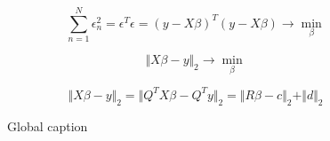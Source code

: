 
\begin{equation}
  \label{eq:minimization}
  \sum\limits^{N}_{n=1} \epsilon^2_n = \epsilon^T \epsilon = (y - X \beta)^T (y - X \beta) \rightarrow \min\limits_{\beta}
\end{equation}


\begin{equation}
  \label{eq:minimization_general}
  \Vert X\beta - y \Vert_2 \rightarrow \min\limits_{\beta}
\end{equation}

\begin{equation}
  \label{eq:orthogonal_transformation}
  \Vert X\beta - y \Vert_2 = \Vert Q^T X \beta - Q^T y \Vert_2 = \Vert R \beta - c \Vert_2 + \Vert d \Vert_2
\end{equation}

\begin{figure}[t]
  \centering
  \begin{narrow}{-0.2\textwidth}{0.2\textwidth}
    \caption{Global caption}
  \end{narrow}
  \label{fig:nm_wfl_distributions}
\end{figure}

